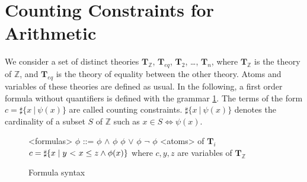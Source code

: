 \documentclass[]{article}
\begin{document}
%

\section{Counting Constraints for Arithmetic}

We consider a set of distinct theories $\mathbf{T}_\mathbb{Z}$,
$\mathbf{T}_{eq}$, $\mathbf{T}_2$, \ldots{}, $\mathbf{T}_n$, where
$\mathbf{T}_\mathbb{Z}$ is the theory of $\mathbb{Z}$, and
$\mathbf{T}_{eq}$ is the theory of equality between the other theory.
Atoms and variables of these theories are defined as usual. In the
following, a first order formula without quantifiers is defined with the
grammar \ref{formula}. The terms of the form
$c = \sharp\{ x\ |\ \psi(x) \}$ are called counting constraints. 
$\sharp\{ x\ |\ \psi(x)\}$ denotes the cardinality of a subset $S$
of $\mathbb{Z}$ such as $x \in S \iff \psi(x)$.

\begin{figure}[h]
\begin{grammar}
    
<formulas> $\phi$ ::= $\phi$ $\land$ $\phi$
\alt $\phi$ $\lor$ $\phi$
\alt $\lnot$ $\phi$
\alt <atoms> of $\mathbf{T}_i$
\alt $c = \sharp\{ x \mid y\ \text{\textless}\ x \le z \land \phi(x) \}$ where $c, y, z$ are variables of $\mathbf{T}_\mathbb{Z}$

\end{grammar}

\caption{Formula syntax}
\label{formula}
\end{figure}
\end{document}
